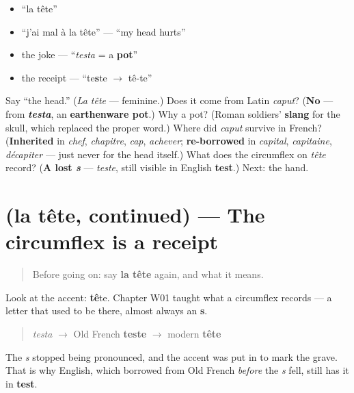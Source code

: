 \begin{itemize}
\raggedright
  \item \textquotedblleft{}la tête\textquotedblright{}
  \item \textquotedblleft{}j'ai mal à la tête\textquotedblright{} — \textquotedblleft{}my head hurts\textquotedblright{}
  \item the joke — \textquotedblleft{}\emph{testa} = a \textbf{pot}\textquotedblright{}
  \item the receipt — \textquotedblleft{}te\textbf{s}te $\to$ tê-te\textquotedblright{}
\end{itemize}

\begin{tcolorbox}[breakable,colback=teal!4,colframe=teal!35!black,title={Before you move on}]
Say \textquotedblleft{}the head.\textquotedblright{} (\emph{La tête} — feminine.) Does it come from Latin \emph{caput}? (\textbf{No} — from \emph{\textbf{testa}}, an \textbf{earthenware pot}.) Why a pot? (Roman soldiers' \textbf{slang} for the skull, which replaced the proper word.) Where did \emph{caput} survive in French? (\textbf{Inherited} in \emph{chef}, \emph{chapitre}, \emph{cap}, \emph{achever}; \textbf{re-borrowed} in \emph{capital}, \emph{capitaine}, \emph{décapiter} — just never for the head itself.) What does the circumflex on \emph{tête} record? (\textbf{A lost \emph{s}} — \emph{teste}, still visible in English \textbf{test}.) Next: the hand.
\end{tcolorbox}
\section[(la tête, continued)]{(la tête, continued) — The circumflex is a receipt}

\label{lesson:FR-C17-tete-more}



\begin{quote}
Before going on: say \textbf{la tête} again, and what it means.
\end{quote}

\begin{sounds}
Look at the accent: \textbf{tê}te. Chapter W01 taught what a circumflex records — a letter that used to be there, almost always an \textbf{s}.

\begin{quote}
\emph{testa} $\to$ Old French \textbf{teste} $\to$ modern \textbf{tête}
\end{quote}

The \emph{s} stopped being pronounced, and the accent was put in to mark the grave. That is why English, which borrowed from Old French \emph{before} the \emph{s} fell, still has it in \textbf{test}.
\end{sounds}

